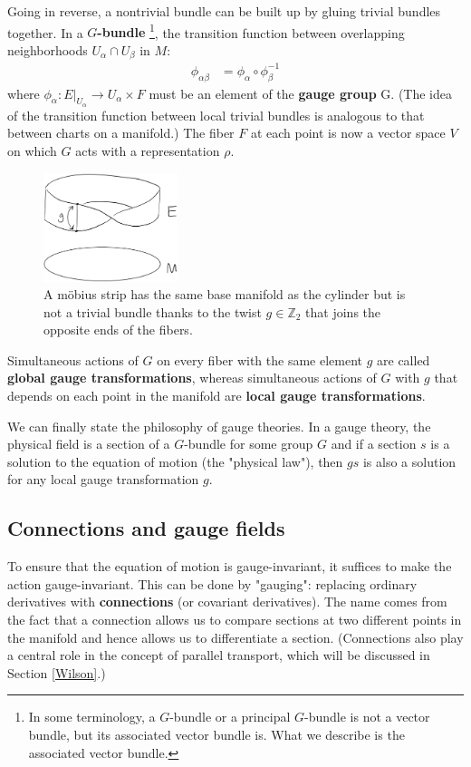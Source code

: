 \documentclass[aps,nofootinbib]{revtex4}
\begin{document}
Going in reverse, a nontrivial bundle can be built up by gluing trivial bundles together. In a {\bf $G$-bundle} \footnote{In some terminology, a $G$-bundle or a principal $G$-bundle is not a vector bundle, but its associated vector bundle is. What we describe is the associated vector bundle.}, the transition function between overlapping neighborhoods $U_{\alpha} \cap U_{\beta}$ in $M$:
\begin{align*} 
\phi_{\alpha \beta} &= \phi_{\alpha} \circ \phi_{\beta}^{-1}
\end{align*}
where $\phi_{\alpha}: E\big|_{U_{\alpha}} \to U_{\alpha} \times F$ must be an element of the {\bf gauge group} G. (The idea of the transition function between local trivial bundles is analogous to that between charts on a manifold.) The fiber $F$ at each point is now a vector space $V$ on which $G$ acts with a representation $\rho$.
\begin{figure}
\includegraphics[width=0.35\textwidth]{mobius.png}
\caption{A m{\"o}bius strip has the same base manifold as the cylinder but is not a trivial bundle thanks to the twist $g\in \mathbb{Z}_2$ that joins the opposite ends of the fibers.}
\end{figure}
Simultaneous actions of $G$ on every fiber with the same element $g$ are called {\bf global gauge transformations}, whereas simultaneous actions of $G$ with $g$ that depends on each point in the manifold are {\bf local gauge transformations}.

We can finally state the philosophy of gauge theories. In a gauge theory, the physical field is a section of a $G$-bundle for some group $G$ and if a section $s$ is a solution to the equation of motion (the "physical law"), then $gs$ is also a solution for any local gauge transformation $g$.

\subsection{Connections and gauge fields}
To ensure that the equation of motion is gauge-invariant, it suffices to make the action gauge-invariant. This can be done by "gauging": replacing ordinary derivatives with {\bf connections} (or covariant derivatives). The name comes from the fact that a connection allows us to compare sections at two different points in the manifold and hence allows us to differentiate a section.  (Connections also play a central role in the concept of parallel transport, which will be discussed in Section \ref{Wilson}.)
\end{document}
